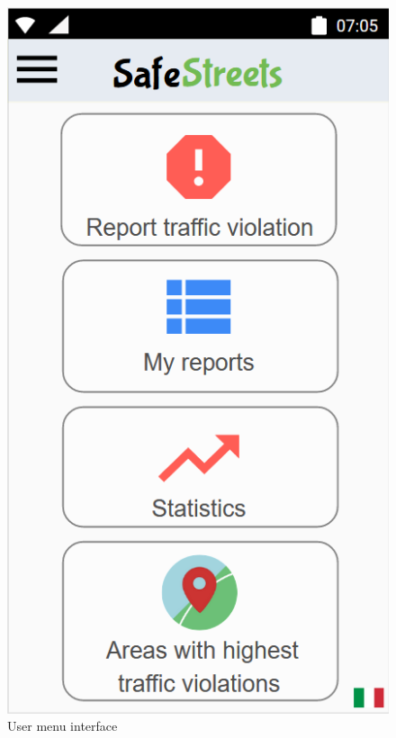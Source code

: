         \begin{figure}[h]
        \centering
        \includegraphics[scale=0.5]{Images/user_menu.png}
        \caption{User menu interface}
    \end{figure}

